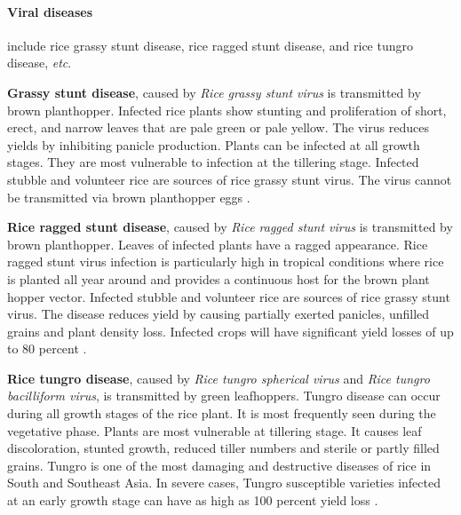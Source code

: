 \paragraph{Viral diseases} include rice grassy stunt disease, rice ragged stunt disease, and rice tungro disease, \textit{etc}. 

\textbf{Grassy stunt disease}, caused by \textit{Rice grassy stunt virus} is transmitted by brown planthopper. Infected rice plants show stunting and proliferation of short, erect, and narrow leaves that are pale green or pale yellow. The virus reduces yields by inhibiting panicle production. Plants can be infected at all growth stages. They are most vulnerable to infection at the tillering stage. Infected stubble and volunteer rice are sources of rice grassy stunt virus. The virus cannot be transmitted via brown planthopper eggs \citep{Ou_1985_Rice,Ling_1972_Rice}.

\textbf{Rice ragged stunt disease}, caused by \textit{Rice ragged stunt virus} is transmitted by brown planthopper. Leaves of infected plants have a ragged appearance. Rice ragged stunt virus infection is particularly high in tropical conditions where rice is planted all year around and provides a continuous host for the brown plant hopper vector. Infected stubble and volunteer rice are sources of rice grassy stunt virus. The disease reduces yield by causing partially exerted panicles, unfilled grains and plant density loss. Infected crops will have significant yield losses of up to 80 percent \citep{Ling_1972_Rice}.

\textbf{Rice tungro disease}, caused by \textit{Rice tungro spherical virus} and \textit{Rice tungro bacilliform virus}, is transmitted by green leafhoppers. Tungro disease can occur during all growth stages of the rice plant. It is most frequently seen during the vegetative phase. Plants are most vulnerable at tillering stage. It causes leaf discoloration, stunted growth, reduced tiller numbers and sterile or partly filled grains. Tungro is one of the most damaging and destructive diseases of rice in South and Southeast Asia. In severe cases, Tungro susceptible varieties infected at an early growth stage can have as high as 100 percent yield loss \citep{Ou_1985_Rice}.

